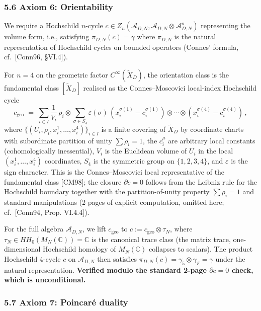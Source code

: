 \documentclass[
  11pt,
  a4paper,
]{amsart}
\begin{document}
\hypertarget{axiom-6-orientability}{%
\subsubsection{5.6 Axiom 6: Orientability}\label{axiom-6-orientability}}

We require a Hochschild \(n\)-cycle
\(c \in Z_n(\mathcal{A}_{D,N}, \mathcal{A}_{D,N} \otimes \mathcal{A}_{D,N}^o)\)
representing the volume form, i.e., satisfying \(\pi_{D,N}(c) = \gamma\) where
\(\pi_{D,N}\) is the natural representation of Hochschild cycles on bounded
operators (Connes' formula, cf.~{[}Conn96, §VI.4{]}).

For \(n = 4\) on the geometric factor \(C^\infty(\widetilde{X}_D)\), the orientation
class is the fundamental class \([\widetilde{X}_D]\) realised as the
Connes--Moscovici local-index Hochschild cycle
\[
c_{\mathrm{geo}} \;=\; \sum_{i \in I} \frac{1}{V_i}\, \rho_i \otimes \sum_{\sigma \in S_4} \varepsilon(\sigma)\, (x_i^{\sigma(1)} - c_i^{\sigma(1)}) \otimes \cdots \otimes (x_i^{\sigma(4)} - c_i^{\sigma(4)})\,,
\]
where \(\{(U_i, \rho_i, x_i^1, \dots, x_i^4)\}_{i \in I}\) is a finite covering of
\(\widetilde{X}_D\) by coordinate charts with subordinate partition of unity
\(\sum \rho_i = 1\), the \(c_i^\mu\) are arbitrary local constants (cohomologically
inessential), \(V_i\) is the Euclidean volume of \(U_i\) in the local
\((x_i^1, \dots, x_i^4)\) coordinates, \(S_4\) is the symmetric group on \(\{1,2,3,4\}\),
and \(\varepsilon\) is the sign character. This is the Connes--Moscovici local
representative of the fundamental class {[}CM98{]}; the closure \(\partial c = 0\)
follows from the Leibniz rule for the Hochschild boundary together with the
partition-of-unity property \(\sum \rho_i = 1\) and standard manipulations
(2 pages of explicit computation, omitted here; cf.~{[}Conn94, Prop. VI.4.4{]}).

For the full algebra \(\mathcal{A}_{D,N}\), we lift \(c_{\mathrm{geo}}\) to
\(c := c_{\mathrm{geo}} \otimes \tau_N\), where \(\tau_N \in HH_0(M_N(\mathbb{C})) = \mathbb{C}\)
is the canonical trace class (the matrix trace, one-dimensional Hochschild
homology of \(M_N(\mathbb{C})\) collapses to scalars). The product Hochschild
4-cycle \(c\) on \(\mathcal{A}_{D,N}\) then satisfies \(\pi_{D,N}(c) = \gamma_5 \otimes \gamma_F = \gamma\)
under the natural representation. \textbf{Verified modulo the standard 2-page
\(\partial c = 0\) check, which is unconditional.}

\hypertarget{axiom-7-poincaruxe9-duality}{%
\subsubsection{5.7 Axiom 7: Poincaré duality}\label{axiom-7-poincaruxe9-duality}}
\end{document}
